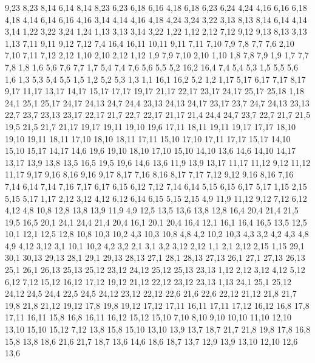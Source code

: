 9,23
8,23
8,14
%
6,14
8,14
8,23
6,23
6,18
6,16
%
4,18
6,18
6,23
6,24
4,24
%
4,16
6,16
6,18
4,18
%
4,14
6,14
6,16
4,16
%
3,14
4,14
4,16
4,18
4,24
3,24
3,22
%
3,13
8,13
8,14
6,14
4,14
3,14
%
1,22
3,22
3,24
1,24
%
1,13
3,13
3,14
3,22
1,22
%
1,12
2,12
7,12
9,12
9,13
8,13
3,13
1,13
%
7,11
9,11
9,12
7,12
%
7,4
16,4
16,11
10,11
9,11
7,11
7,10
7,9
7,8
7,7
7,6
%
2,10
7,10
7,11
7,12
2,12
%
1,10
2,10
2,12
1,12
%
1,9
7,9
7,10
2,10
1,10
%
1,8
7,8
7,9
1,9
%
1,7
7,7
7,8
1,8
%
1,6
5,6
7,6
7,7
1,7
%
5,4
7,4
7,6
5,6
5,5
%
5,2
16,2
16,4
7,4
5,4
5,3
%
1,5
5,5
5,6
1,6
%
1,3
5,3
5,4
5,5
1,5
%
1,2
5,2
5,3
1,3
%
1,1
16,1
16,2
5,2
1,2
1,17
5,17
6,17
7,17
8,17
9,17
11,17
13,17
14,17
15,17
17,17
19,17
21,17
22,17
23,17
24,17
25,17
25,18
1,18
%
24,1
25,1
25,17
24,17
24,13
24,7
24,4
%
23,13
24,13
24,17
23,17
%
23,7
24,7
24,13
23,13
%
22,7
23,7
23,13
23,17
22,17
%
21,7
22,7
22,17
21,17
%
21,4
24,4
24,7
23,7
22,7
21,7
21,5
%
19,5
21,5
21,7
21,17
19,17
19,11
19,10
19,6
%
17,11
18,11
19,11
19,17
17,17
%
18,10
19,10
19,11
18,11
%
17,10
18,10
18,11
17,11
%
15,10
17,10
17,11
17,17
15,17
%
14,10
15,10
15,17
14,17
%
14,6
19,6
19,10
18,10
17,10
15,10
14,10
%
13,6
14,6
14,10
14,17
13,17
13,9
13,8
%
13,5
16,5
19,5
19,6
14,6
13,6
%
11,9
13,9
13,17
11,17
11,12
%
9,12
11,12
11,17
9,17
9,16
%
8,16
9,16
9,17
8,17
%
7,16
8,16
8,17
7,17
%
7,12
9,12
9,16
8,16
7,16
7,14
%
6,14
7,14
7,16
7,17
6,17
6,15
%
6,12
7,12
7,14
6,14
%
5,15
6,15
6,17
5,17
%
1,15
2,15
5,15
5,17
1,17
%
2,12
3,12
4,12
6,12
6,14
6,15
5,15
2,15
%
4,9
11,9
11,12
9,12
7,12
6,12
4,12
%
4,8
10,8
12,8
13,8
13,9
11,9
4,9
%
12,5
13,5
13,6
13,8
12,8
%
16,4
20,4
21,4
21,5
19,5
16,5
%
20,1
24,1
24,4
21,4
20,4
%
16,1
20,1
20,4
16,4
%
12,1
16,1
16,4
16,5
13,5
12,5
%
10,1
12,1
12,5
12,8
10,8
10,3
10,2
%
4,3
10,3
10,8
4,8
%
4,2
10,2
10,3
4,3
%
3,2
4,2
4,3
4,8
4,9
4,12
3,12
%
3,1
10,1
10,2
4,2
3,2
%
2,1
3,1
3,2
3,12
2,12
%
1,1
2,1
2,12
2,15
1,15
29,1
30,1
30,13
29,13
%
28,1
29,1
29,13
28,13
%
27,1
28,1
28,13
27,13
%
26,1
27,1
27,13
26,13
%
25,1
26,1
26,13
25,13
25,12
%
23,12
24,12
25,12
25,13
23,13
%
1,12
2,12
3,12
4,12
5,12
6,12
7,12
15,12
16,12
17,12
19,12
21,12
22,12
23,12
23,13
1,13
%
24,1
25,1
25,12
24,12
24,5
24,4
%
22,5
24,5
24,12
23,12
22,12
22,6
%
21,6
22,6
22,12
21,12
21,8
21,7
%
19,8
21,8
21,12
19,12
%
17,8
19,8
19,12
17,12
17,11
%
16,11
17,11
17,12
16,12
%
16,8
17,8
17,11
16,11
%
15,8
16,8
16,11
16,12
15,12
15,10
%
7,10
8,10
9,10
10,10
11,10
12,10
13,10
15,10
15,12
7,12
%
13,8
15,8
15,10
13,10
13,9
%
13,7
18,7
21,7
21,8
19,8
17,8
16,8
15,8
13,8
%
18,6
21,6
21,7
18,7
%
13,6
14,6
18,6
18,7
13,7
%
12,9
13,9
13,10
12,10
%
12,6
13,6
